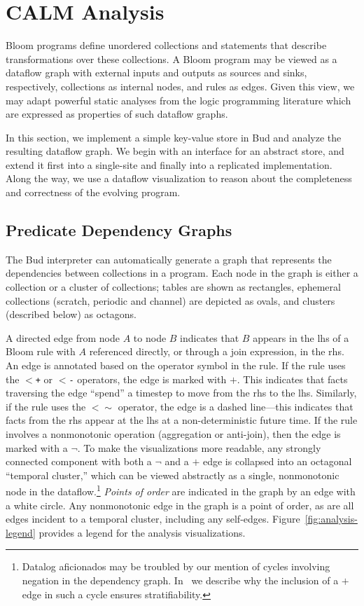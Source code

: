 \section{CALM Analysis}
Bloom programs define unordered collections and statements that describe
transformations over these collections.  A Bloom program may be viewed as a
dataflow graph with external inputs and outputs as sources and sinks,
respectively, collections as internal nodes, and rules as edges.  Given this
view, we may adapt powerful static analyses from the logic programming
literature which are expressed as properties of such dataflow graphs.

In this section, we implement a simple key-value store in Bud and analyze the
resulting dataflow graph.  We begin with an interface for an abstract store, and
extend it first into a single-site and finally into a replicated implementation.
Along the way, we use a dataflow visualization to reason about the completeness
and correctness of the evolving program.


\subsection{Predicate Dependency Graphs}
The Bud interpreter can automatically generate a graph that represents the
dependencies between collections in a program. Each node in the graph is either
a collection or a cluster of collections; tables are shown as rectangles,
ephemeral collections (scratch, periodic and channel) are depicted as ovals, and
clusters (described below) as octagons.

A directed edge from node $A$ to node $B$ indicates that $B$ appears in the lhs
of a Bloom rule with $A$ referenced directly, or through a join expression, in
the rhs.  An edge is annotated based on the operator symbol in the rule. If the
rule uses the \texttt{$<$+} or \texttt{$<$-} operators, the edge is marked with
$+$. This indicates that facts traversing the edge ``spend'' a timestep to move
from the rhs to the lhs. Similarly, if the rule uses the \texttt{$<\sim$}
operator, the edge is a dashed line---this indicates that facts from the rhs
appear at the lhs at a non-deterministic future time. If the rule involves a
nonmonotonic operation (aggregation or anti-join), then the edge is marked with
a $\lnot$.  To make the visualizations more readable, any strongly connected
component with both a $\lnot$ and a $+$ edge is collapsed into an octagonal
``temporal cluster,'' which can be viewed abstractly as a single, nonmonotonic
node in the dataflow.\footnote{Datalog aficionados may be troubled by our
  mention of cycles involving negation in the dependency graph.
  In~\cite{dedalus} we describe why the inclusion of a $+$ edge in such a cycle
  ensures stratifiability.}  \emph{Points of order} are indicated in the graph
by an edge with a white circle.  Any nonmonotonic edge in the graph is a point
of order, as are all edges incident to a temporal cluster, including any
self-edges.  Figure~\ref{fig:analysis-legend} provides a legend for the analysis
visualizations.

